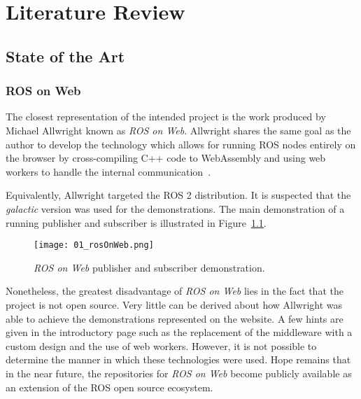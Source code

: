 \chapter{Literature Review}\label{cha:literature}


\section{State of the Art}


    \subsection{ROS on Web}

        The closest representation of the intended project is the work produced by Michael Allwright known as \textit{ROS on Web}. Allwright shares the same goal as the author to develop the technology which allows for running ROS nodes entirely on the browser by cross-compiling C++ code to WebAssembly and using web workers to handle the internal communication~\cite{rosonweb}.

        Equivalently, Allwright targeted the \ac{ROS} 2 distribution. It is suspected that the \textit{galactic} version was used for the demonstrations. The main demonstration of a running publisher and subscriber is illustrated in Figure~\ref{fig:rosweb}.
        
        
        \begin{figure}[htbp]
            \centering
            \texttt{[image: 01\_rosOnWeb.png]}
            \caption{\textit{ROS on Web} publisher and subscriber demonstration.}
            \label{fig:rosweb}
        \end{figure}

        Nonetheless, the greatest disadvantage of \textit{ROS on Web} lies in the fact that the project is not open source. Very little can be derived about how Allwright was able to achieve the demonstrations represented on the website. A few hints are given in the introductory page such as the replacement of the middleware with a custom design and the use of web workers. However, it is not possible to determine the manner in which these technologies were used. Hope remains that in the near future, the repositories for \textit{ROS on Web} become publicly available as an extension of the ROS open source ecosystem.


